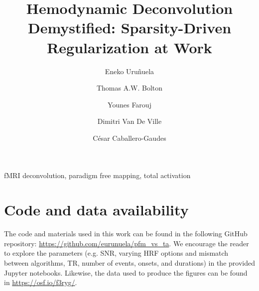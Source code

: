 \documentclass[preprint]{elsarticle}
\begin{document}
\begin{frontmatter}

\title{Hemodynamic Deconvolution Demystified: Sparsity-Driven Regularization at Work}

\author[bcbl,upv]{Eneko Uru\~nuela}

\author[chuv,epfl]{Thomas A.W. Bolton}
\author[epfl]{Younes Farouj}
\author[epfl,unige]{Dimitri Van De Ville}
\author[bcbl]{C\'{e}sar Caballero-Gaudes}

\address[bcbl]{Basque Center on Cognition, Brain and Language (BCBL), Donostia-San Sebasti\'{a}n, Spain.}
\address[upv]{University of the Basque Country (EHU/UPV), Donostia-San Sebasti\'{a}n, Spain.}
\address[chuv]{Gamma Knife Center, Department of Clinical Neuroscience, Centre Hospitalier Universitaire Vaudois (CHUV), Lausanne, Switzerland}
\address[epfl]{Ecole polytechnique f\'ed\'erale de Lausanne (EPFL), Geneva, Switzerland.}
\address[unige]{Faculty of Medicine, University of Geneva, Geneva, Switzerland}

\begin{abstract}

\end{abstract}

\begin{keyword}
fMRI deconvolution, paradigm free mapping, total activation
\end{keyword}

\end{frontmatter}

\linenumbers











\section{Code and data availability}
\label{sec:github}
The code and materials used in this work can be found in the following GitHub repository: \url{https://github.com/eurunuela/pfm_vs_ta}. We encourage the reader to explore the parameters (e.g. SNR, varying HRF options and mismatch between algorithms, TR, number of events, onsets, and durations) in the provided Jupyter notebooks. Likewise, the data used to produce the figures can be found in \url{https://osf.io/f3ryg/}.
\end{document}

